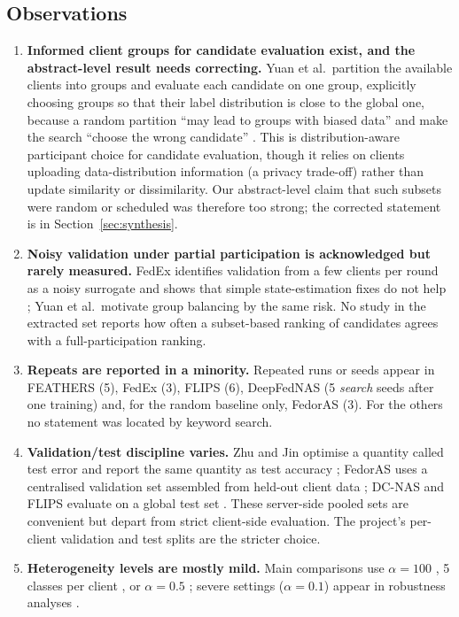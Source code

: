 \documentclass[11pt,a4paper]{article}
\begin{document}
\subsection{Observations}
\begin{enumerate}
\item \textbf{Informed client groups for candidate evaluation exist, and the abstract-level result needs correcting.} Yuan et al.\ partition the available clients into groups and evaluate each candidate on one group, explicitly choosing groups so that their label distribution is close to the global one, because a random partition ``may lead to groups with biased data'' and make the search ``choose the wrong candidate'' \cite{yuan2022resourceaware}. This is distribution-aware participant choice for candidate evaluation, though it relies on clients uploading data-distribution information (a privacy trade-off) rather than update similarity or dissimilarity. Our abstract-level claim that such subsets were random or scheduled was therefore too strong; the corrected statement is in Section~\ref{sec:synthesis}.
\item \textbf{Noisy validation under partial participation is acknowledged but rarely measured.} FedEx identifies validation from a few clients per round as a noisy surrogate and shows that simple state-estimation fixes do not help \cite{khodak2021federated}; Yuan et al.\ motivate group balancing by the same risk. No study in the extracted set reports how often a subset-based ranking of candidates agrees with a full-participation ranking.
\item \textbf{Repeats are reported in a minority.} Repeated runs or seeds appear in FEATHERS (5), FedEx (3), FLIPS (6), DeepFedNAS (5 \emph{search} seeds after one training) and, for the random baseline only, FedorAS (3). For the others no statement was located by keyword search.
\item \textbf{Validation/test discipline varies.} Zhu and Jin optimise a quantity called test error and report the same quantity as test accuracy \cite{zhu2021realtime}; FedorAS uses a centralised validation set assembled from held-out client data \cite{dudziak2022fedoras}; DC-NAS and FLIPS evaluate on a global test set \cite{venkatesha2023divideandconquer,bhope2023flips}. These server-side pooled sets are convenient but depart from strict client-side evaluation. The project's per-client validation and test splits are the stricter choice.
\item \textbf{Heterogeneity levels are mostly mild.} Main comparisons use $\alpha=100$ \cite{khan2026deepfednas}, 5 classes per client \cite{zhu2021realtime}, or $\alpha=0.5$ \cite{venkatesha2023divideandconquer}; severe settings ($\alpha=0.1$) appear in robustness analyses \cite{dudziak2022fedoras,khan2026deepfednas}.

\end{enumerate}
\end{document}
